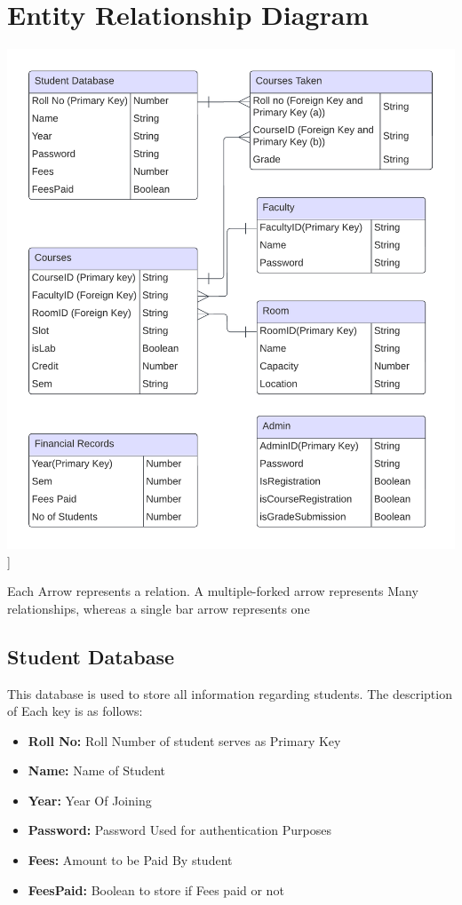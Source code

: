 \documentclass[12pt,a4paper]{article}
\begin{document}
\section{Entity Relationship Diagram}
    \includegraphics[scale=1.2]{ERDiagram.png}]

    Each Arrow represents a relation. A multiple-forked arrow represents Many relationships, whereas a single bar arrow represents one
    
    
    \subsection{Student Database}
        This database is used to store all information regarding students. The description of Each key is as follows:
        \begin{itemize}
        \item \textbf{Roll No:} Roll Number of student serves as Primary Key
        \item  \textbf{Name:} Name of Student
        \item  \textbf{Year:} Year Of Joining
        \item  \textbf{Password:} Password Used for authentication Purposes
        \item  \textbf{Fees:} Amount to be Paid By student
        \item  \textbf{FeesPaid:} Boolean to store if Fees paid or not
    \end{itemize}
\end{document}
